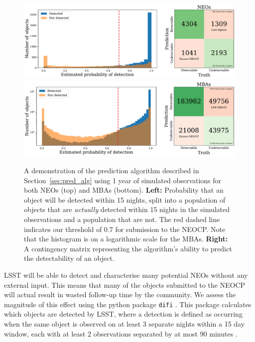 \documentclass[twocolumn]{aastex631}
\newcommand{\thresholdAlg}{0.7}
\begin{document}
\begin{figure}[htb]
    \centering
    \includegraphics[width=\textwidth]{contingency_neo.pdf}
    \includegraphics[width=\textwidth]{contingency_mba.pdf}
    \caption{A demonstration of the prediction algorithm described in Section~\ref{sec:pred_alg} using 1 year of simulated observations for both NEOs (top) and MBAs (bottom). \textbf{Left:} Probability that an object will be detected within 15 nights, split into a population of objects that are \textit{actually} detected within 15 nights in the simulated observations and a population that are not. The red dashed line indicates our threshold of $\thresholdAlg{}$ for submission to the NEOCP. Note that the histogram is on a logarithmic scale for the MBAs. \textbf{Right:} A contingency matrix representing the algorithm's ability to predict the detectability of an object.}
    \label{fig:contingency}
\end{figure}

LSST will be able to detect and characterise many potential NEOs without any external input. This means that many of the objects submitted to the NEOCP will actual result in wasted follow-up time by the community. We assess the magnitude of this effect using the python package \texttt{difi} \citep{difi}. This package calculates which objects are detected by LSST, where a detection is defined as occurring when the same object is observed on at least 3 separate nights within a 15 day window, each with at least 2 observations separated by at most 90 minutes \citep{oss}.
\end{document}
